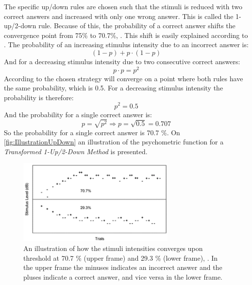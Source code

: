 The specific up/down rules are chosen such that the stimuli is reduced with two correct answers and increased with only one wrong answer. This is called the 1-up/2-down rule. Because of this, the probability of a correct answer shifts the convergence point from 75\% to 70.7\%, \parencite[p. 22]{PDF:Psychoacoustic}. This shift is easily explained according to \textcite[p. 293]{PDF:Hearing}. The probability of an increasing stimulus intensity due to an incorrect answer is: 
%
\begin{equation}
	(1-p)+p\cdot(1-p)
\end{equation}  
%
And for a decreasing stimulus intensity due to two consecutive correct answers: 
%
\begin{equation}
	p\cdot p = p^2
\end{equation}    
%       
According to \textcite[p. 293]{PDF:Hearing} the chosen strategy will converge on a point where both rules have the same probability, which is 0.5. For a decreasing stimulus intensity the probability is therefore:
%
\begin{equation}
	p^2=0.5
\end{equation}  
%
And the probability for a single correct answer is: 
%
\begin{equation}
	p = \sqrt{p^2} \Rightarrow p = \sqrt{0.5} = 0.707
\end{equation}
%
So the probability for a single correct answer is 70.7 \%. On \autoref{fig:IllustrationUpDown} an illustration of the psychometric function for a \textit{Transformed 1-Up/2-Down Method} is presented. 
%
\begin{figure}[H]
	\centering
	\includegraphics[resolution=300,width=0.7\textwidth]{Figure/IllustrationOfUpDown}
	\caption{An illustration of how the stimuli intensities converges upon threshold at 70.7 \% (upper frame) and 29.3 \% (lower frame), \parencite[p. 294]{PDF:Hearing}. In the upper frame the minuses indicates an incorrect answer and the pluses indicate a correct answer, and vice versa in the lower frame.}
	\label{fig:IllustrationUpDown}
\end{figure}
